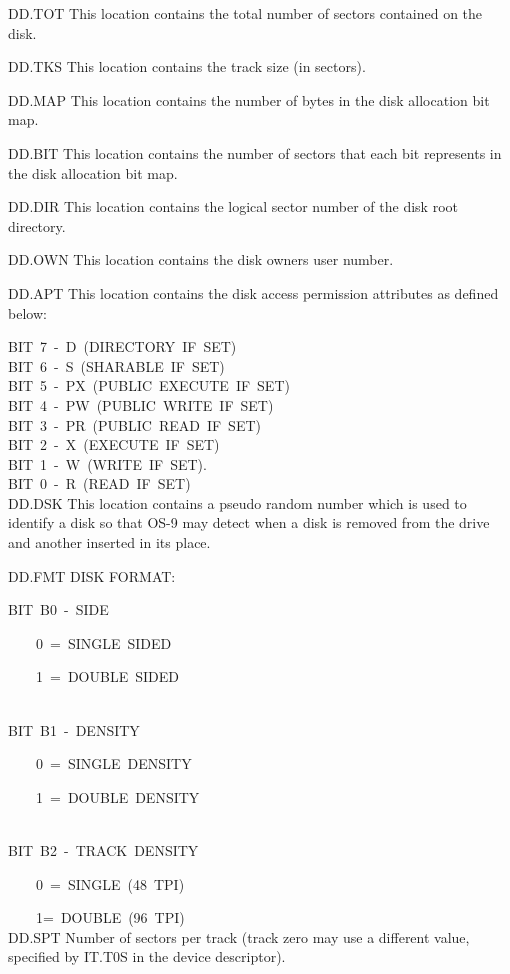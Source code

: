 \documentclass[
]{article}
\begin{document}
DD.TOT This location contains the total number of sectors contained on
the disk.

DD.TKS This location contains the track size (in sectors).

DD.MAP This location contains the number of bytes in the disk allocation
bit map.

DD.BIT This location contains the number of sectors that each bit
represents in the disk allocation bit map.

DD.DIR This location contains the logical sector number of the disk root
directory.

DD.OWN This location contains the disk owner\textquotesingle s user
number.

DD.APT This location contains the disk access permission attributes as
defined below:

BIT~7~-~D~(DIRECTORY~IF~SET)\\
BIT~6~-~S~(SHARABLE~IF~SET)\\
BIT~5~-~PX~(PUBLIC~EXECUTE~IF~SET)\\
BIT~4~-~PW~(PUBLIC~WRITE~IF~SET)\\
BIT~3~-~PR~(PUBLIC~READ~IF~SET)\\
BIT~2~-~X~(EXECUTE~IF~SET)\\
BIT~1~-~W~(WRITE~IF~SET).\\
BIT~0~-~R~(READ~IF~SET)\\

DD.DSK This location contains a pseudo random number which is used to
identify a disk so that OS-9 may detect when a disk is removed from the
drive and another inserted in its place.

DD.FMT DISK FORMAT:

BIT~B0~-~SIDE\\
\strut ~~~~0~=~SINGLE~SIDED\\
\strut ~~~~1~=~DOUBLE~SIDED\\
\strut ~\\
BIT~B1~-~DENSITY\\
\strut ~~~~0~=~SINGLE~DENSITY\\
\strut ~~~~1~=~DOUBLE~DENSITY\\
\strut ~\\
BIT~B2~-~TRACK~DENSITY\\
\strut ~~~~0~=~SINGLE~(48~TPI)\\
\strut ~~~~1=~DOUBLE~(96~TPI)\\

DD.SPT Number of sectors per track (track zero may use a different
value, specified by IT.T0S in the device descriptor).
\end{document}
